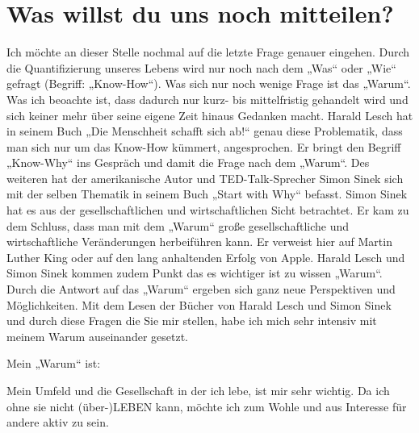 \documentclass[12pt]{scrreprt}
\begin{document}
\section*{Was willst du uns noch mitteilen?}
Ich möchte an dieser Stelle nochmal auf die letzte Frage genauer eingehen. Durch die Quantifizierung
unseres Lebens wird nur noch nach dem „Was“ oder „Wie“ gefragt (Begriff: „Know-How“).
Was sich nur noch wenige Frage ist das „Warum“. Was ich beoachte ist, dass dadurch nur kurz- bis
mittelfristig gehandelt wird und sich keiner mehr über seine eigene Zeit hinaus Gedanken macht.
 Harald Lesch hat in seinem Buch „Die Menschheit schafft sich ab!“ genau
diese Problematik, dass man sich nur um das Know-How kümmert, angesprochen. Er bringt den
Begriff „Know-Why“ ins Gespräch und damit die Frage nach dem „Warum“. Des weiteren
hat der amerikanische Autor und TED-Talk-Sprecher Simon Sinek sich mit der selben Thematik
in seinem Buch „Start with Why“ befasst. Simon Sinek hat es aus der gesellschaftlichen
und wirtschaftlichen Sicht betrachtet. Er kam zu dem Schluss, dass man mit dem „Warum“
große gesellschaftliche und wirtschaftliche Veränderungen herbeiführen kann. Er verweist hier
auf Martin Luther King oder auf den lang anhaltenden Erfolg von Apple.
Harald Lesch und Simon Sinek kommen zudem Punkt das es wichtiger ist zu wissen „Warum“.
Durch die Antwort auf das „Warum“ ergeben sich ganz neue Perspektiven und Möglichkeiten.
Mit dem Lesen der Bücher von Harald Lesch und Simon Sinek und durch diese Fragen die Sie
mir stellen, habe ich mich sehr intensiv mit meinem Warum auseinander gesetzt.

Mein „Warum“ ist:

Mein Umfeld und die Gesellschaft in der ich lebe, ist mir sehr wichtig. Da ich ohne sie 
nicht (über-)LEBEN kann, möchte ich zum Wohle und aus Interesse für andere aktiv zu sein.
\end{document}
